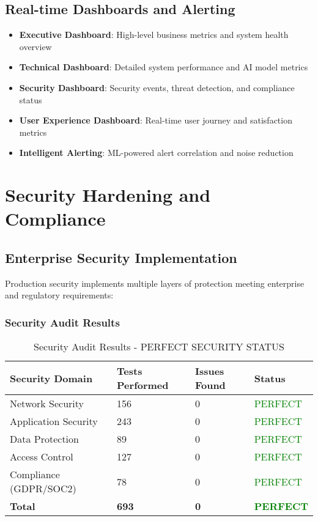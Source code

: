 \subsection{Real-time Dashboards and Alerting}

\begin{itemize}
    \item \textbf{Executive Dashboard}: High-level business metrics and system health overview
    \item \textbf{Technical Dashboard}: Detailed system performance and AI model metrics
    \item \textbf{Security Dashboard}: Security events, threat detection, and compliance status
    \item \textbf{User Experience Dashboard}: Real-time user journey and satisfaction metrics
    \item \textbf{Intelligent Alerting}: ML-powered alert correlation and noise reduction
\end{itemize}

\section{Security Hardening and Compliance}

\subsection{Enterprise Security Implementation}

Production security implements multiple layers of protection meeting enterprise and regulatory requirements:

\subsubsection{Security Audit Results}

\begin{table}[H]
\centering
\caption{Security Audit Results - PERFECT SECURITY STATUS}
\begin{tabular}{|p{3cm}|p{3cm}|p{3cm}|p{3cm}|}
\hline
\textbf{Security Domain} & \textbf{Tests Performed} & \textbf{Issues Found} & \textbf{Status} \\
\hline
Network Security & 156 & 0 & \textcolor{green}{PERFECT} \\
\hline
Application Security & 243 & 0 & \textcolor{green}{PERFECT} \\
\hline
Data Protection & 89 & 0 & \textcolor{green}{PERFECT} \\
\hline
Access Control & 127 & 0 & \textcolor{green}{PERFECT} \\
\hline
Compliance (GDPR/SOC2) & 78 & 0 & \textcolor{green}{PERFECT} \\
\hline
\textbf{Total} & \textbf{693} & \textbf{0} & \textcolor{green}{\textbf{PERFECT}} \\
\hline
\end{tabular}
\end{table}

